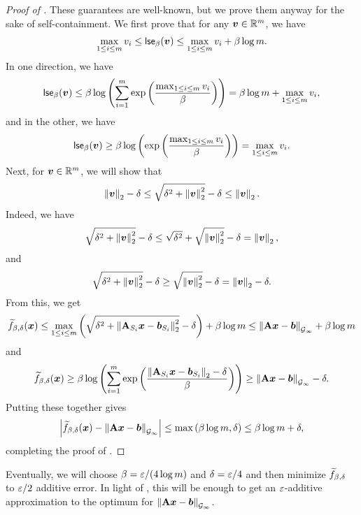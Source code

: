 \begin{proof}[Proof of ]
These guarantees are well-known, but we prove them anyway for the sake of self-containment. We first prove that for any $\bm{v}\in\mathbb{R}^m$, we have 
\begin{align*}
    \max_{1 \le i \le m} v_i \le \mathsf{lse}_{\beta}(\bm{v}) \le \max_{1 \le i \le m} v_i +\beta\log m.
\end{align*}
In one direction, we have
\begin{align*}
    \mathsf{lse}_{\beta}(\bm{v}) \le \beta\log\left(\sum_{i=1}^m \mathrm{exp}\left(\frac{\max_{1\le i \le m} v_i}{\beta}\right)\right) = \beta\log m + \max_{1 \le i \le m} v_i,
\end{align*}
and in the other, we have
\begin{align*}
    \mathsf{lse}_{\beta}(\bm{v}) \ge \beta\log\left(\mathrm{exp}\left(\frac{\max_{1 \le i \le m} v_i}{\beta}\right)\right) = \max_{1 \le i \le m} v_i.
\end{align*}
Next, for $\bm{v} \in \mathbb{R}^m$, we will show that
\begin{align*}
    \left\lVert \bm{v} \right\rVert_2 - \delta \le \sqrt{\delta^2+\left\lVert \bm{v} \right\rVert_2^2} - \delta \le \left\lVert \bm{v} \right\rVert_2.
\end{align*}
Indeed, we have
\begin{align*}
    \sqrt{\delta^2+\left\lVert \bm{v} \right\rVert_2^2} - \delta \le \sqrt{\delta^2} + \sqrt{\left\lVert \bm{v} \right\rVert_2^2} - \delta = \left\lVert \bm{v} \right\rVert_2,
\end{align*}
and
\begin{align*}
    \sqrt{\delta^2+\left\lVert \bm{v} \right\rVert_2^2} - \delta \ge \sqrt{\left\lVert \bm{v} \right\rVert_2^2} - \delta = \left\lVert \bm{v} \right\rVert_2 - \delta.
\end{align*}
From this, we get
\begin{align*}
    \widetilde{f}_{\beta,\delta}(\bm{x}) \le \max_{1 \le i \le m} \left(\sqrt{\delta^2+\left\lVert \mathbf{A}_{S_i}\bm{x}-\bm{b}_{S_i} \right\rVert_2^2}-\delta\right) + \beta\log m \le \left\lVert \mathbf{A}\bm{x}-\bm{b} \right\rVert_{\mathcal{G}_{\infty}} + \beta\log m
\end{align*}
and
\begin{align*}
    \widetilde{f}_{\beta,\delta}(\bm{x}) \ge \beta\log\left(\sum_{i=1}^m \mathrm{exp}\left(\frac{\left\lVert \mathbf{A}_{S_i}\bm{x}-\bm{b}_{S_i} \right\rVert_2-\delta}{\beta}\right)\right) \ge \left\lVert \mathbf{A}\bm{x}-\bm{b} \right\rVert_{\mathcal{G}_{\infty}}-\delta.
\end{align*}
Putting these together gives
\begin{align*}
    \left\lvert \widetilde{f}_{\beta,\delta}(\bm{x})-\left\lVert \mathbf{A}\bm{x}-\bm{b} \right\rVert_{\mathcal{G}_{\infty}} \right\rvert \le \max\left(\beta\log m, \delta\right) \le \beta\log m + \delta,
\end{align*}
completing the proof of .
\end{proof}
Eventually, we will choose $\beta = \varepsilon/(4\log m)$ and $\delta = \varepsilon/4$ and then minimize $\widetilde{f}_{\beta,\delta}$ to $\varepsilon/2$ additive error. In light of , this will be enough to get an $\varepsilon$-additive approximation to the optimum for $\left\lVert \mathbf{A}\bm{x}-\bm{b} \right\rVert_{\mathcal{G}_{\infty}}$.


